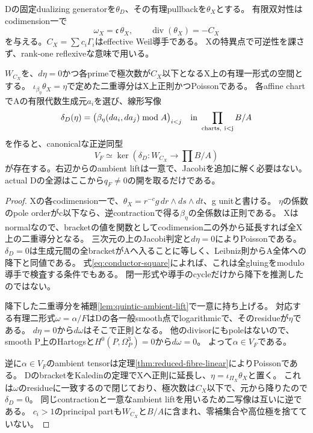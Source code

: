 Dの固定dualizing generatorを$\theta_D$、その有理pullbackを$\theta_X$とする。
有限双対性はcodimension一で
\[
 \omega_X=\mathfrak c\,\theta_X,\qquad
 \operatorname{div}(\theta_X)=-C_X
\]
を与える。$C_X=\sum c_i\Gamma_i$はeffective Weil導手である。
Xの特異点で可逆性を課さず、rank-one reflexiveな意味で用いる。
\begin{theorem}\label{thm:normalization-residue-source}
$W_{C_X}$を、$d\eta=0$かつ各primeで極次数が$C_X$以下となるX上の有理一形式の空間とする。
$\iota_{\beta_\eta}\theta_X=\eta$で定めた二重導分はX上正則かつPoissonである。
各affine chartでAの有限代数生成元$a_i$を選び、線形写像
\begin{equation}
 \delta_D(\eta)=\bigl(\beta_\eta(da_i,da_j)\bmod A\bigr)_{i<j}
       \quad\text{in }\prod_{\rm charts,\ i<j}B/A                  \label{eq:residue-descent}
\end{equation}
を作ると、canonicalな正逆同型
\begin{equation}
 V_F\simeq\ker(\delta_D:W_{C_X}\to\textstyle\prod B/A)             \label{eq:normalization-full-source}
\end{equation}
が存在する。右辺からのambient liftは一意で、Jacobiを追加に解く必要はない。
actual Dの全源はここから$q_F\ne0$の開を取るだけである。
\end{theorem}
\begin{proof}
Xの各codimension一で、$\theta_X=r^{-c}g\,dr\wedge ds\wedge dt$、g unitと書ける。
$\eta$の係数のpole orderがc以下なら、逆contractionで得る$\beta_\eta$の全係数は正則である。
Xはnormalなので、bracketの値を関数としてcodimension二の外から延長すれば全X上の二重導分となる。
三次元の上のJacobi判定と$d\eta=0$によりPoissonである。
$\delta_D=0$は生成元間の全bracketがAへ入ることに等しく、Leibniz則からA全体への降下と同値である。
式\eqref{eq:conductor-square}によれば、これは全gluingをmodulo導手で検査する条件でもある。
閉一形式や導手のcycleだけから降下を推測したのではない。

降下した二重導分を補題\ref{lem:quintic-ambient-lift}で一意に持ち上げる。
対応する有理二形式$\omega=\alpha/F$はDの各一般smooth点でlogarithmicで、そのresidueが$\eta$である。
$d\eta=0$から$d\omega$はそこで正則となる。
他のdivisorにもpoleはないので、smooth P上のHartogsと$H^0(P,\Omega_P^3)=0$から$d\omega=0$。
よって$\alpha\in V_F$である。

逆に$\alpha\in V_F$のambient tensorは定理\ref{thm:reduced-fibre-linear}によりPoissonである。
DのbracketをKaledinの定理でXへ正則に延長し、$\eta=\iota_{\Pi_X}\theta_X$と置く。
これは$\omega$のresidueに一致するので閉じており、極次数は$C_X$以下で、元から降りたので$\delta_D=0$。
同じcontractionと一意なambient liftを用いるため二写像は互いに逆である。
$c_i>1$のprincipal partも$W_{C_X}$と$B/A$に含まれ、零補集合や高位極を捨てていない。
\end{proof}

